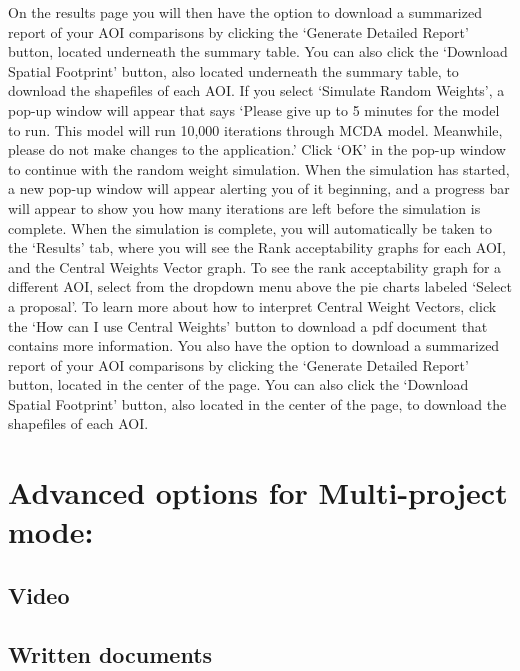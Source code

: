\documentclass[
]{book}
\begin{document}
On the results page you will then have the option to download a summarized report of your AOI comparisons by clicking the `Generate Detailed Report' button, located underneath the summary table. You can also click the `Download Spatial Footprint' button, also located underneath the summary table, to download the shapefiles of each AOI.
If you select `Simulate Random Weights', a pop-up window will appear that says `Please give up to 5 minutes for the model to run. This model will run 10,000 iterations through MCDA model. Meanwhile, please do not make changes to the application.' Click `OK' in the pop-up window to continue with the random weight simulation. When the simulation has started, a new pop-up window will appear alerting you of it beginning, and a progress bar will appear to show you how many iterations are left before the simulation is complete. When the simulation is complete, you will automatically be taken to the `Results' tab, where you will see the Rank acceptability graphs for each AOI, and the Central Weights Vector graph. To see the rank acceptability graph for a different AOI, select from the dropdown menu above the pie charts labeled `Select a proposal'. To learn more about how to interpret Central Weight Vectors, click the `How can I use Central Weights' button to download a pdf document that contains more information. You also have the option to download a summarized report of your AOI comparisons by clicking the `Generate Detailed Report' button, located in the center of the page. You can also click the `Download Spatial Footprint' button, also located in the center of the page, to download the shapefiles of each AOI.

\hypertarget{advanced-options-for-multi-project-mode}{%
\chapter{Advanced options for Multi-project mode:}\label{advanced-options-for-multi-project-mode}}

\hypertarget{video-4}{%
\section{Video}\label{video-4}}

\hypertarget{written-documents-4}{%
\section{Written documents}\label{written-documents-4}}
\end{document}

